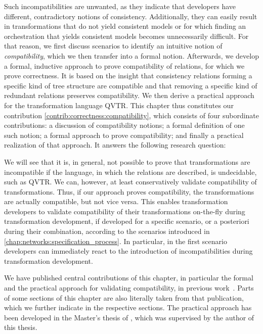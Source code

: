 Such incompatibilities are unwanted, as they indicate that developers have different, contradictory notions of consistency.
Additionally, they can easily result in transformations that do not yield consistent models or for which finding an orchestration that yields consistent models becomes unnecessarily difficult.
For that reason, we first discuss scenarios to identify an intuitive notion of \emph{compatibility}, which we then transfer into a formal notion.
Afterwards, we develop a formal, inductive approach to prove compatibility of relations, for which we prove correctness.
It is based on the insight that consistency relations forming a specific kind of tree structure are compatible and that removing a specific kind of redundant relations preserves compatibility.
We then derive a practical approach for the transformation language \gls{QVTR}.
This chapter thus constitutes our contribution \autoref{contrib:correctness:compatibility}, which consists of four subordinate contributions: a discussion of compatibility notions; a formal definition of one such notion; a formal approach to prove compatibility; and finally a practical realization of that approach.
It answers the following research question:


We will see that it is, in general, not possible to prove that transformations are incompatible if the language, in which the relations are described, is undecidable, such as \gls{QVTR}.
We can, however, at least conservatively validate compatibility of transformations.
Thus, if our approach proves compatibility, the transformations are actually compatible, but not vice versa.
This enables transformation developers to validate compatibility of their transformations on-the-fly during transformation development, if developed for a specific scenario, or a posteriori during their combination, according to the scenarios introduced in \autoref{chap:networks:specification_process}.
In particular, in the first scenario developers can immediately react to the introduction of incompatibilities during transformation development.

We have published central contributions of this chapter, in particular the formal and the practical approach for validating compatibility, in previous work~.
Parts of some sections of this chapter are also literally taken from that publication, which we further indicate in the respective sections.
The practical approach has been developed in the Master's thesis of , which was supervised by the author of this thesis.






